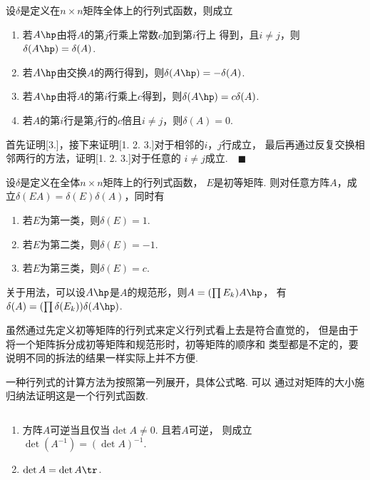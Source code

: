   \begin{thm}[行列式的性质]
    设$\delta$是定义在$n\times n$矩阵全体上的行列式函数，则成立
    \begin{enumerate}
      \item 若$A\hp$由将$A$的第$j$行乘上常数$c$加到第$i$行上
        得到，且$i\ne j$，则$\delta(A\hp) = \delta(A)$.
      \item 若$A\hp$由交换$A$的两行得到，则$\delta(A\hp)
        =-\delta(A)$.
      \item 若$A\hp$由将$A$的第$i$行乘上$c$得到，则$\delta(A\hp)
        =c\delta(A)$.
      \item 若$A$的第$i$行是第$j$行的$c$倍且$i\ne j$，则$\delta
        (A)=0$.
    \end{enumerate}
  \end{thm}
  \proof
    首先证明[3.]，接下来证明[1. 2. 3.]对于相邻的$i$，$j$行成立，
    最后再通过反复交换相邻两行的方法，证明[1. 2. 3.]对于任意的
    $i\ne j$成立.$\quad\blacksquare$

  \begin{cor}[行列式与初等矩阵]
    \label{cor: 行列式与初等矩阵}
    设$\delta$是定义在全体$n\times n$矩阵上的行列式函数，
    $E$是初等矩阵. 则对任意方阵$A$，成立$\delta(EA)
    =\delta(E)\delta(A)$，同时有
    \begin{enumerate}
      \item 若$E$为第一类，则$\delta(E)=1$.
      \item 若$E$为第二类，则$\delta(E)=-1$.
      \item 若$E$为第三类，则$\delta(E)=c$.
    \end{enumerate}
  \end{cor}
  \remark
    关于用法，可以设$A\hp$是$A$的规范形，则$A=(\prod E_k)A\hp$，
    有$\delta(A)=(\prod\delta(E_k))\delta(A\hp)$.\par
    虽然通过先定义初等矩阵的行列式来定义行列式看上去是符合直觉的，
    但是由于将一个矩阵拆分成初等矩阵和规范形时，初等矩阵的顺序和
    类型都是不定的，要说明不同的拆法的结果一样实际上并不方便.

  \begin{defi}[行列式]
    一种行列式的计算方法为按照第一列展开，具体公式略. 可以
    通过对矩阵的大小施归纳法证明这是一个行列式函数.
  \end{defi}

  \begin{cor}
    $\,$
    \begin{enumerate}
      \item 方阵$A$可逆当且仅当$\det A\ne 0$. 且若$A$可逆，
        则成立$\det(A^{-1}) = (\det A)^{-1}$.
      \item $\det A = \det A\tr$.
    \end{enumerate}
  \end{cor}

